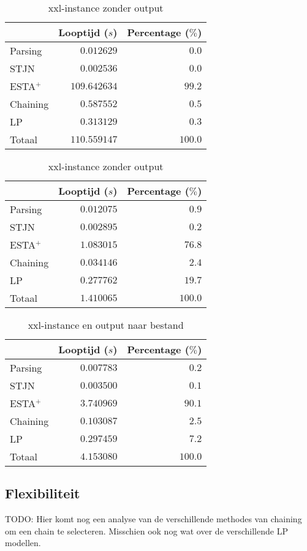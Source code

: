 \begin{table}[H]
\parbox{.45\linewidth}{
    \centering
    \begin{tabular}{| l | r | r |}
        \hline
                    & Looptijd ($s$)  & Percentage ($\%$) \\
        \hline
        Parsing     & $0.012629$      & $0.0$   \\
        STJN        & $0.002536$      & $0.0$   \\
        ESTA$^+$    & $109.642634$    & $99.2$  \\
        Chaining    & $0.587552$      & $0.5$   \\
        LP          & $0.313129$      & $0.3$   \\
        \hline \hline
        Totaal      & $110.559147$    & $100.0$ \\
        \hline
    \end{tabular}
    \caption{xxl-instance met output}
    \label{tbl:xxl+output}
}
\hfill
\parbox{.45\linewidth}{
    \centering
    \begin{tabular}{| l | r | r |}
        \hline
                    & Looptijd ($s$)& Percentage ($\%$) \\
        \hline
        Parsing     & $0.012075$      & $0.9$   \\
        STJN        & $0.002895$      & $0.2$   \\
        ESTA$^+$    & $1.083015$      & $76.8$  \\
        Chaining    & $0.034146$      & $2.4$   \\
        LP          & $0.277762$      & $19.7$  \\
        \hline \hline
        Totaal      & $1.410065$      & $100.0$ \\
        \hline
    \end{tabular}
    \caption{xxl-instance zonder output}
    \label{tbl:xxl-output}
}
\end{table}

\begin{table}[H]
    \centering
    \begin{tabular}{| l | r | r|}
        \hline
                    & Looptijd ($s$)& Percentage ($\%$) \\
        \hline
        
        Parsing     & $0.007783$    & $0.2$     \\
        STJN        & $0.003500$    & $0.1$     \\
        ESTA$^+$    & $3.740969$    & $90.1$    \\
        Chaining    & $0.103087$    & $2.5$     \\
        LP          & $0.297459$    & $7.2$     \\
        \hline \hline
        Totaal      & $4.153080$    & $100.0$   \\
        \hline
    \end{tabular}
    \caption{xxl-instance en output naar bestand}
    \label{tbl:xxl+outputbestand}
\end{table}

\subsection{Flexibiliteit}
TODO: Hier komt nog een analyse van de verschillende methodes van chaining om een chain te selecteren. Misschien ook nog wat over de verschillende LP modellen.
